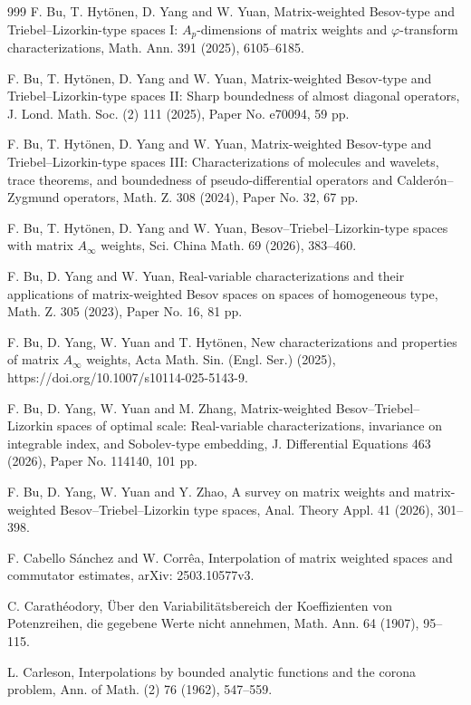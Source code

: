 \documentclass[11pt, reqno]{amsart}
\theoremstyle{definition}
\theoremstyle{remark}
\numberwithin{equation}{section}
\begin{document}
\begin{thebibliography}{999}
F. Bu, T. Hyt\"{o}nen, D. Yang and W. Yuan,
Matrix-weighted Besov-type and Triebel--Lizorkin-type spaces I:
$A_p$-dimensions of matrix weights and $\varphi$-transform characterizations,
Math. Ann. 391 (2025), 6105--6185.

F. Bu, T. Hyt\"{o}nen, D. Yang and W. Yuan,
Matrix-weighted Besov-type and Triebel--Lizorkin-type spaces II:
Sharp boundedness of almost diagonal operators,
J. Lond. Math. Soc. (2) 111 (2025), Paper No. e70094, 59 pp.

F. Bu, T. Hyt\"{o}nen, D. Yang and W. Yuan,
Matrix-weighted Besov-type and Triebel--Lizorkin-type spaces III:
Characterizations of molecules and wavelets, trace theorems,
and boundedness of pseudo-differential operators
and Calderón--Zygmund operators, Math. Z. 308 (2024),
Paper No. 32, 67 pp.

F. Bu, T. Hyt\"{o}nen, D. Yang and W. Yuan,
Besov--Triebel--Lizorkin-type spaces with matrix $A_{\infty}$ weights,
Sci. China Math. 69 (2026), 383--460.

F. Bu, D. Yang and W. Yuan,
Real-variable characterizations and their applications of
matrix-weighted Besov spaces on spaces of homogeneous type,
Math. Z. 305 (2023), Paper No. 16, 81 pp.

F. Bu, D. Yang, W. Yuan and T. Hyt\"{o}nen,
New characterizations and properties of matrix $A_{\infty}$ weights,
Acta Math. Sin. (Engl. Ser.) (2025),  https://doi.org/10.1007/s10114-025-5143-9.

F. Bu, D. Yang, W. Yuan and M. Zhang,
Matrix-weighted Besov--Triebel--Lizorkin spaces of optimal scale:
Real-variable characterizations, invariance on integrable index, and Sobolev-type embedding,
J. Differential Equations 463 (2026), Paper No. 114140, 101 pp.

F. Bu, D. Yang, W. Yuan and Y. Zhao,
A survey on matrix weights and matrix-weighted Besov--Triebel--Lizorkin type spaces,
Anal. Theory Appl. 41 (2026), 301--398.

F. Cabello S\'anchez and W. Corr\^ea,
Interpolation of matrix weighted spaces and commutator estimates,
arXiv: 2503.10577v3.

C. Carath\'eodory,
\"Uber den Variabilit\"atsbereich der Koeffizienten von Potenzreihen,
die gegebene Werte nicht annehmen, Math. Ann. 64 (1907),  95--115.

L. Carleson,
Interpolations by bounded analytic functions and the corona problem,
Ann. of Math. (2) 76 (1962), 547--559.


\end{thebibliography}
\end{document}
